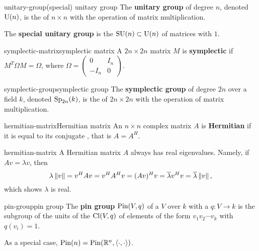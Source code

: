 \begin{topic}{unitary-group}{(special) unitary group}
    The \textbf{unitary group} of degree $n$, denoted $\textup{U}(n)$, is the  of $n \times n$  with the operation of matrix multiplication.
    
    The \textbf{special unitary group} is the  $\textup{SU}(n) \subset \textup{U}(n)$ of matrices with  $1$.
\end{topic}

\begin{topic}{symplectic-matrix}{symplectic matrix}
    A $2n \times 2n$ matrix $M$ is \textbf{symplectic} if $M^T \Omega M = \Omega$, where $\Omega = \begin{pmatrix} 0 & I_n \\ -I_n & 0 \end{pmatrix}$.
\end{topic}

\begin{topic}{symplectic-group}{symplectic group}
    The \textbf{symplectic group} of degree $2n$ over a field $k$, denoted $\textup{Sp}_{2n}(k)$, is the  of $2n \times 2n$  with the operation of matrix multiplication.
\end{topic}

\begin{topic}{hermitian-matrix}{Hermitian matrix}
    An $n \times n$ complex matrix $A$ is \textbf{Hermitian} if it is equal to its conjugate , that is $A = A^H$.
\end{topic}

\begin{example}{hermitian-matrix}
    A Hermitian matrix $A$ always has real eigenvalues. Namely, if $Av = \lambda v$, then
    \[ \lambda \left\|v\right\| = v^H A v = v^H A^H v = (A v)^H v = \overline{\lambda} v^H v = \overline{\lambda} \left\|v\right\| , \]
    which shows $\lambda$ is real.
\end{example}

\begin{topic}{pin-group}{pin group}
    The \textbf{pin group} $\textup{Pin}(V, q)$ of a  $V$ over $k$ with a  $q : V \to k$ is the subgroup of the units of the  $\textup{Cl}(V, q)$ of elements of the form $v_1 v_2 \cdots v_k$ with $q(v_i) = 1$.
    
    As a special case, $\textup{Pin}(n) = \textup{Pin}(\mathbb{R}^n, \langle \cdot, \cdot \rangle)$.
\end{topic}

